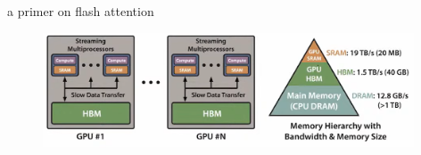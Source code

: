 \begin{frame}{a primer on flash attention}

\vfill

	\begin{figure}
		\centering
		\includegraphics[width = 11cm]{figure/memory-hierarchy2.png}\\ 
	\end{figure}
	
\vfill

\end{frame}


